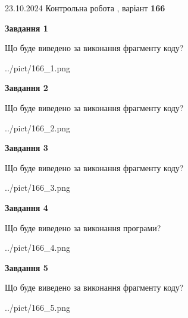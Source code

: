 \documentclass[12pt, ukrainian]{article}
\begin{document}
{\Large{23.10.2024 Контрольна робота , варіант  \No \textbf { 166 }\par}}
{
\begin {large}
{\begin {center}\textbf{Завдання 1}\end {center}}

Що буде виведено за виконання фрагменту коду?\par
\begin{center}
	{../pict/166_1.png}
\end{center}
\newpage

{\begin {center}\textbf{Завдання 2}\end {center}}

Що буде виведено за виконання фрагменту коду?\par
\begin{center}
	{../pict/166_2.png}
\end{center}
\newpage

{\begin {center}\textbf{Завдання 3}\end {center}}

Що буде виведено за виконання фрагменту коду?\par
\begin{center}
	{../pict/166_3.png}
\end{center}
\newpage

{\begin {center}\textbf{Завдання 4}\end {center}}

Що буде виведено за виконання програми?\par
\begin{center}
	{../pict/166_4.png}
\end{center}
\newpage

{\begin {center}\textbf{Завдання 5}\end {center}}

Що буде виведено за виконання фрагменту коду?\par
\begin{center}
	{../pict/166_5.png}
\end{center}
\newpage


\end{large}}
\end{document}
